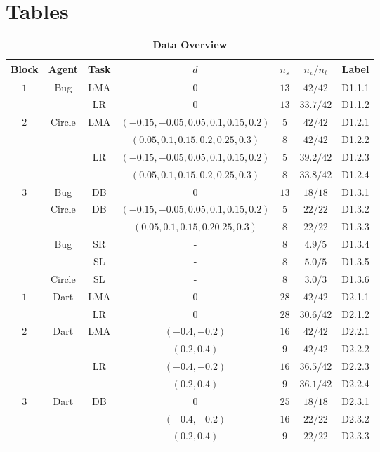\documentclass[10pt]{article}
\begin{document}
\section*{Tables}
\begin{table}[!ht]
\caption{
\bf{Data Overview}}
\begin{tabular}{|c|c|c|c|c|c|c|}
\hline
Block & Agent & Task & $d$ & $n_s$ & $n_v/n_t$ & Label\\
\hline
$1$ & Bug & LMA & $0$ & $13$ & $42/42$ & D1.1.1 \\
\hline
 & & LR & $0$ & $13$ & $33.7/42$ & D1.1.2 \\
\hline
 $2$ & Circle & LMA & $(-0.15, -0.05, 0.05, 0.1, 0.15, 0.2)$ & $5$ & $42/42$  & D1.2.1\\
\hline
 &  & & $(0.05, 0.1,0.15, 0.2, 0.25,0.3)$ & $8$ & $42/42$ & D1.2.2\\
\hline
 & & LR & $(-0.15, -0.05, 0.05, 0.1, 0.15, 0.2)$ & $5$ & $39.2/42$& D1.2.3 \\
\hline
 &  &  & $(0.05, 0.1,0.15, 0.2, 0.25,0.3)$ & $8$ & $33.8/42$ & D1.2.4 \\
\hline
 $3$ & Bug & DB & $0$ & $13$ & $18/18$ & D1.3.1\\
\hline
 & Circle & DB & $(-0.15, -0.05, 0.05, 0.1, 0.15, 0.2)$ & $5$ & $22/22$ & D1.3.2\\
\hline
 & & & $(0.05, 0.1,0.15, 0.2 0.25,0.3)$ & $8$ & $22/22$ & D1.3.3\\
\hline
 & Bug & SR & - & $8$ & $4.9/5$ & D1.3.4\\
\hline
 & & SL & - & $8$ & $5.0/5$ & D1.3.5\\
\hline
 & Circle & SL & - & $8$ & $3.0/3$ & D1.3.6\\
\hline
 $1$ & Dart & LMA & $0$ & $28$ & $42/42$ & D2.1.1 \\
\hline
 & & LR & $0$ & $28$ & $30.6/42$ & D2.1.2\\
\hline
$2$ & Dart & LMA & $(-0.4,-0.2)$ & $16$ & $42/42$ & D2.2.1  \\
\hline
 & & & $(0.2, 0.4)$ & $9$ & $42/42$ & D2.2.2 \\
\hline
 & & LR & $(-0.4,-0.2)$ & $16$ & $36.5/42$ & D2.2.3 \\
\hline
 & & & $(0.2, 0.4)$ & $9$ & $36.1/42$ & D2.2.4 \\
\hline
$3$ & Dart & DB & $0$ & $25$ & $18/18$ & D2.3.1 \\
\hline
 & & & $(-0.4,-0.2)$ & $16$ &$22/22$ & D2.3.2 \\
\hline
 & & & $(0.2, 0.4)$ & $9$ & $22/22$ & D2.3.3 \\

\end{tabular}
\end{table}
\end{document}
